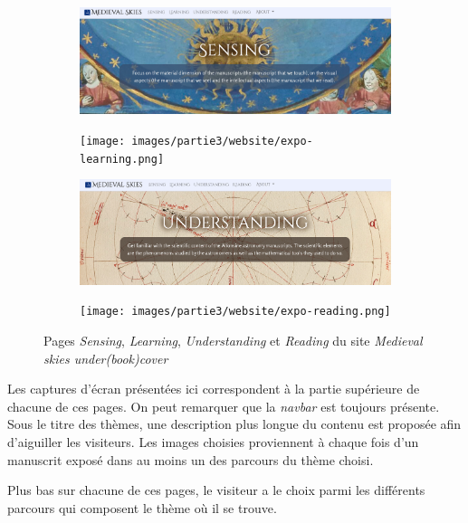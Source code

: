     \begin{figure}[!h]
    \centering
    \begin{subfigure}[h]{0.4\textwidth}
        \includegraphics[width=\textwidth]{images/partie3/website/expo-sensing.png}
    \end{subfigure}
    \begin{subfigure}[h]{0.4\textwidth}
        \texttt{[image: images/partie3/website/expo-learning.png]}
    \end{subfigure}
    \begin{subfigure}[h]{0.4\textwidth}
        \includegraphics[width=\textwidth]{images/partie3/website/expo-understanding.png}
    \end{subfigure}
    \begin{subfigure}[h]{0.4\textwidth}
        \texttt{[image: images/partie3/website/expo-reading.png]}
    \end{subfigure}
    \caption{Pages \textit{Sensing}, \textit{Learning}, \textit{Understanding} et \textit{Reading} du site \textit{Medieval skies under(book)cover}}
    \end{figure}

    Les captures d'écran présentées ici correspondent à la partie supérieure de chacune de ces pages. On peut remarquer que la \textit{navbar} est toujours présente. Sous le titre des thèmes, une description plus longue du contenu est proposée afin d'aiguiller les visiteurs. Les images choisies proviennent à chaque fois d'un manuscrit exposé dans au moins un des parcours du thème choisi. 
    
    Plus bas sur chacune de ces pages, le visiteur a le choix parmi les différents parcours qui composent le thème où il se trouve.
    

